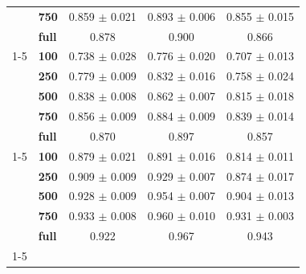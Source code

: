\begin{table}[t]
\begin{tabular}{llccc}
\textbf{} & \textbf{750} & 0.859 $\pm$ 0.021 & 0.893 $\pm$ 0.006 & 0.855 $\pm$ 0.015 \\
\textbf{} & \textbf{full} & 0.878 & 0.900 & 0.866 \\
\cline{1-5}
\multirow[t]{5}{*}{\textbf{Oromo}} & \textbf{100} & 0.738 $\pm$ 0.028 & 0.776 $\pm$ 0.020 & 0.707 $\pm$ 0.013 \\
\textbf{} & \textbf{250} & 0.779 $\pm$ 0.009 & 0.832 $\pm$ 0.016 & 0.758 $\pm$ 0.024 \\
\textbf{} & \textbf{500} & 0.838 $\pm$ 0.008 & 0.862 $\pm$ 0.007 & 0.815 $\pm$ 0.018 \\
\textbf{} & \textbf{750} & 0.856 $\pm$ 0.009 & 0.884 $\pm$ 0.009 & 0.839 $\pm$ 0.014 \\
\textbf{} & \textbf{full} & 0.870 & 0.897 & 0.857 \\
\cline{1-5}
\multirow[t]{5}{*}{\textbf{Nig. Pidgin}} & \textbf{100} & 0.879 $\pm$ 0.021 & 0.891 $\pm$ 0.016 & 0.814 $\pm$ 0.011 \\
\textbf{} & \textbf{250} & 0.909 $\pm$ 0.009 & 0.929 $\pm$ 0.007 & 0.874 $\pm$ 0.017 \\
\textbf{} & \textbf{500} & 0.928 $\pm$ 0.009 & 0.954 $\pm$ 0.007 & 0.904 $\pm$ 0.013 \\
\textbf{} & \textbf{750} & 0.933 $\pm$ 0.008 & 0.960 $\pm$ 0.010 & 0.931 $\pm$ 0.003 \\
\textbf{} & \textbf{full} & 0.922 & 0.967 & 0.943 \\
\cline{1-5}
\bottomrule
\end{tabular}
\end{table}
